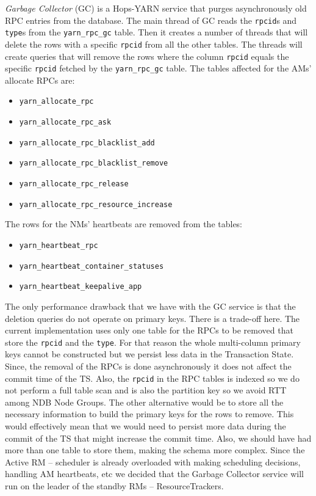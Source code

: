 \emph{Garbage Collector} (GC) is a Hops-YARN service that purges
asynchronously old RPC entries from the database. The main thread of
GC reads the \texttt{rpcid}s and \texttt{type}s from the
\texttt{yarn\_rpc\_gc} table. Then it creates a number of threads that
will delete the rows with a specific \texttt{rpcid} from all the other
tables. The threads will create
queries that will remove the rows where the column \texttt{rpcid}
equals the specific \texttt{rpcid} fetched by the
\texttt{yarn\_rpc\_gc} table. The tables affected for the AMs'
allocate RPCs are:
\begin{itemize}
\item \texttt{yarn\_allocate\_rpc}
\item \texttt{yarn\_allocate\_rpc\_ask}
\item \texttt{yarn\_allocate\_rpc\_blacklist\_add}
\item \texttt{yarn\_allocate\_rpc\_blacklist\_remove}
\item \texttt{yarn\_allocate\_rpc\_release}
\item \texttt{yarn\_allocate\_rpc\_resource\_increase}
\end{itemize}

The rows for the NMs' heartbeats are removed from the tables:
\begin{itemize}
\item \texttt{yarn\_heartbeat\_rpc}
\item \texttt{yarn\_heartbeat\_container\_statuses}
\item \texttt{yarn\_heartbeat\_keepalive\_app}
\end{itemize}

The only performance drawback that we have with the GC service is that
the deletion queries do not operate on primary keys. There is a
trade-off here. The current implementation uses only one table for the
RPCs to be removed that store the \texttt{rpcid} and the
\texttt{type}. For that reason the whole multi-column primary keys
cannot be constructed but
we persist less data in the Transaction State. Since, the removal of
the RPCs is done asynchronously it does not affect the commit time
of the TS. Also, the \texttt{rpcid} in the RPC tables is indexed so we
do not perform a full table scan and is also the partition key so we avoid RTT
among NDB Node Groups. The other alternative would be to
store all the necessary information to build the primary keys for the
rows to remove. This would effectively mean that we would need to persist more
data during the commit of the TS that might increase the commit
time. Also, we should have had more than one table to store them,
making the schema more complex. Since the Active RM -- scheduler is
already overloaded with making scheduling decisions, handling AM
heartbeats, etc we decided that the Garbage Collector service will run on
the leader of the standby RMs -- ResourceTrackers.

